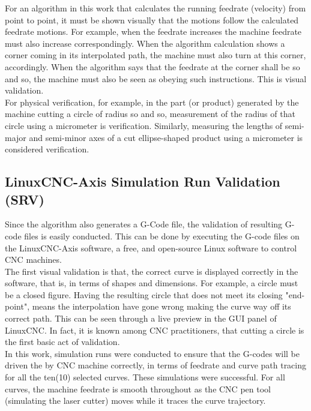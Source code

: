 For an algorithm in this work that calculates the running feedrate (velocity) from point to point, it must be shown visually that the motions follow the calculated feedrate motions. For example, when the feedrate increases the machine feedrate must also increase correspondingly. When the algorithm calculation shows a corner coming in its interpolated path, the machine must also turn at this corner, accordingly. When the algorithm says that the feedrate at the corner shall be so and so, the machine must also be seen as obeying such instructions. This is visual validation.\\  

For physical verification, for example, in the part (or product) generated by the machine cutting a circle of radius so and so, measurement of the radius of that circle using a micrometer is verification. Similarly, measuring the lengths of semi-major and semi-minor axes of a cut ellipse-shaped product using a micrometer is considered verification.


\subsection{LinuxCNC-Axis Simulation Run Validation (SRV)} \label{ssec-chap4-LinuxCNC-Axis Simulation Run Validation (SRV)}

Since the algorithm also generates a G-Code file, the validation of resulting G-code files is easily conducted. This can be done by executing the G-code files on the LinuxCNC-Axis software, a free, and open-source Linux software to control CNC machines. \\

The first visual validation is that, the correct curve is displayed correctly in the software, that is, in terms of shapes and dimensions. For example, a circle must be a closed figure. Having the resulting circle that does not meet its closing "end-point", means the interpolation have gone wrong making the curve way off its correct path. This can be seen through a live preview in the GUI panel of LinuxCNC. In fact, it is known among CNC practitioners, that cutting a circle is the first basic act of validation. \\ 
	
In this work, simulation runs were conducted to ensure that the G-codes will be driven the by CNC machine correctly, in terms of feedrate and curve path tracing for all the ten(10) selected curves. These simulations were successful. For all curves, the machine feedrate is smooth throughout as the CNC pen tool (simulating the laser cutter) moves while it traces the curve trajectory. \\ 

